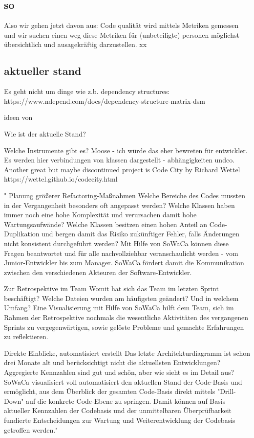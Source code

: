 \subsection{so}
Also wir gehen jetzt davon aus:
Code qualität wird mittels Metriken gemessen und wir suchen einen weg diese Metriken für (unbeteiligte) personen möglichst übersichtlich und ausagekräftig darzustellen.
xx

\subsection{aktueller stand}
Es geht nicht um dinge wie z.b. dependency structures: https://www.ndepend.com/docs/dependency-structure-matrix-dsm


ideen von \cite{ennowulff_2021}

Wie ist der aktuelle Stand?


Welche Instrumente gibt es?
Moose - ich würde das eher bewreten für entwickler. Es werden hier verbindungen von klassen dargestellt - abhängigkeiten undco.
Another great but maybe discontinued project is Code City by Richard Wettel
https://wettel.github.io/codecity.html

"
Planung größerer Refactoring-Maßnahmen
Welche Bereiche des Codes mussten in der Vergangenheit besonders oft angepasst werden? Welche Klassen haben immer noch eine hohe Komplexität und verursachen damit hohe Wartungsaufwände? Welche Klassen besitzen einen hohen Anteil an Code-Duplikation und bergen damit das Risiko zukünftiger Fehler, falls Änderungen nicht konsistent durchgeführt werden? Mit Hilfe von SoWaCa können diese Fragen beantwortet und für alle nachvollziehbar veranschaulicht werden - vom Junior-Entwickler bis zum Manager. SoWaCa fördert damit die Kommunikation zwischen den verschiedenen Akteuren der Software-Entwickler.

Zur Retrospektive im Team
Womit hat sich das Team im letzten Sprint beschäftigt? Welche Dateien wurden am häufigsten geändert? Und in welchem Umfang? Eine Visualisierung mit Hilfe von SoWaCa hilft dem Team, sich im Rahmen der Retrospektive nochmals die wesentliche Aktivitäten des vergangenen Sprints zu vergegenwärtigen, sowie gelöste Probleme und gemachte Erfahrungen zu reflektieren.

Direkte Einblicke, automatisiert erstellt
Das letzte Architekturdiagramm ist schon drei Monate alt und berücksichtigt nicht die aktuellsten Entwicklungen? Aggregierte Kennzahlen sind gut und schön, aber wie sieht es im Detail aus? SoWaCa visualisiert voll automatisiert den aktuellen Stand der Code-Basis und ermöglicht, aus dem Überblick der gesamten Code-Basis direkt mittels "Drill-Down" auf die konkrete Code-Ebene zu springen. Damit können auf Basis aktueller Kennzahlen der Codebasis und der unmittelbaren Überprüfbarkeit fundierte Entscheidungen zur Wartung und Weiterentwicklung der Codebasis getroffen werden."
\cite{systect_2015}



